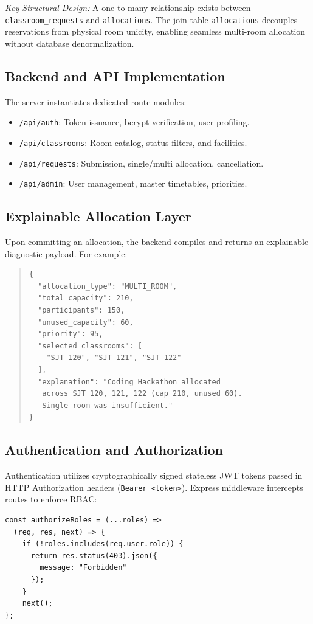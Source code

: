 \documentclass[conference]{IEEEtran}
\begin{document}
\textit{Key Structural Design:} A one-to-many relationship exists between \texttt{classroom\_requests} and \texttt{allocations}. The join table \texttt{allocations} decouples reservations from physical room unicity, enabling seamless multi-room allocation without database denormalization.

\subsection{Backend and API Implementation}
The server instantiates dedicated route modules:
\begin{itemize}
    \item \texttt{/api/auth}: Token issuance, bcrypt verification, user profiling.
    \item \texttt{/api/classrooms}: Room catalog, status filters, and facilities.
    \item \texttt{/api/requests}: Submission, single/multi allocation, cancellation.
    \item \texttt{/api/admin}: User management, master timetables, priorities.
\end{itemize}

\subsection{Explainable Allocation Layer}
Upon committing an allocation, the backend compiles and returns an explainable diagnostic payload. For example:
\begin{quote}
\small
\begin{verbatim}
{
  "allocation_type": "MULTI_ROOM",
  "total_capacity": 210,
  "participants": 150,
  "unused_capacity": 60,
  "priority": 95,
  "selected_classrooms": [
    "SJT 120", "SJT 121", "SJT 122"
  ],
  "explanation": "Coding Hackathon allocated 
   across SJT 120, 121, 122 (cap 210, unused 60).
   Single room was insufficient."
}
\end{verbatim}
\end{quote}

\subsection{Authentication and Authorization}
Authentication utilizes cryptographically signed stateless JWT tokens passed in HTTP Authorization headers (\texttt{Bearer <token>}). Express middleware intercepts routes to enforce RBAC:
\begin{verbatim}
const authorizeRoles = (...roles) => 
  (req, res, next) => {
    if (!roles.includes(req.user.role)) {
      return res.status(403).json({ 
        message: "Forbidden" 
      });
    }
    next();
};
\end{verbatim}
\end{document}
